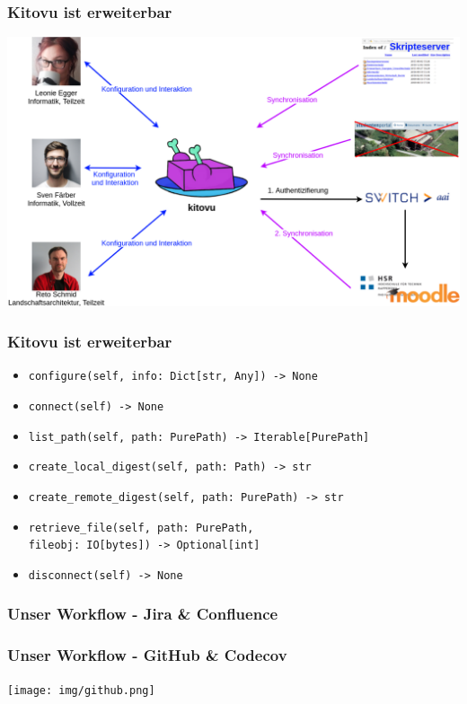 \documentclass{beamer}
\newcommand{\py}[1]{\texttt{#1}}
\begin{document}
	\begin{frame}
	\frametitle{Kitovu ist erweiterbar}
	\includegraphics[width=\linewidth]{../03_End_of_Elaboration/img/kontextdiagramm.png}
	\end{frame}
	
	\begin{frame}[fragile]
	\frametitle{Kitovu ist erweiterbar}

  \begin{itemize}
    \item \py{configure(self, info: Dict[str, Any]) -> None}
    \item \py{connect(self) -> None}
    \item \py{list_path(self, path: PurePath) -> Iterable[PurePath]}
    \item \py{create_local_digest(self, path: Path) -> str}
    \item \py{create_remote_digest(self, path: PurePath) -> str}
    \item \py{retrieve_file(self, path: PurePath,} \\ \hspace{7em} \py{fileobj: IO[bytes]) -> Optional[int]}
    \item \py{disconnect(self) -> None}
  \end{itemize}
\end{frame}
	
	\begin{frame}
		\frametitle{Unser Workflow - Jira \& Confluence}
	\end{frame}
	
	\begin{frame}
	\frametitle{Unser Workflow - GitHub \& Codecov}
  \begin{center}
	\texttt{[image: img/github.png]}
  \end{center}
	\end{frame}
\end{document}
